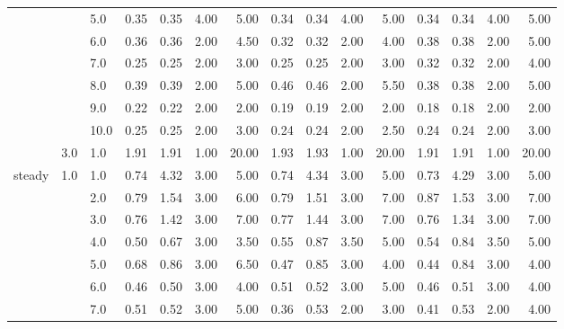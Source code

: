 \begin{tabular}{lllrrrrrrrrrrrr}
       &     & 5.0  &       0.35 &      0.35 & 4.00 &   5.00 &       0.34 &      0.34 & 4.00 &   5.00 &       0.34 &      0.34 & 4.00 &   5.00 \\
       &     & 6.0  &       0.36 &      0.36 & 2.00 &   4.50 &       0.32 &      0.32 & 2.00 &   4.00 &       0.38 &      0.38 & 2.00 &   5.00 \\
       &     & 7.0  &       0.25 &      0.25 & 2.00 &   3.00 &       0.25 &      0.25 & 2.00 &   3.00 &       0.32 &      0.32 & 2.00 &   4.00 \\
       &     & 8.0  &       0.39 &      0.39 & 2.00 &   5.00 &       0.46 &      0.46 & 2.00 &   5.50 &       0.38 &      0.38 & 2.00 &   5.00 \\
       &     & 9.0  &       0.22 &      0.22 & 2.00 &   2.00 &       0.19 &      0.19 & 2.00 &   2.00 &       0.18 &      0.18 & 2.00 &   2.00 \\
       &     & 10.0 &       0.25 &      0.25 & 2.00 &   3.00 &       0.24 &      0.24 & 2.00 &   2.50 &       0.24 &      0.24 & 2.00 &   3.00 \\
       & 3.0 & 1.0  &       1.91 &      1.91 & 1.00 &  20.00 &       1.93 &      1.93 & 1.00 &  20.00 &       1.91 &      1.91 & 1.00 &  20.00 \\
steady & 1.0 & 1.0  &       0.74 &      4.32 & 3.00 &   5.00 &       0.74 &      4.34 & 3.00 &   5.00 &       0.73 &      4.29 & 3.00 &   5.00 \\
       &     & 2.0  &       0.79 &      1.54 & 3.00 &   6.00 &       0.79 &      1.51 & 3.00 &   7.00 &       0.87 &      1.53 & 3.00 &   7.00 \\
       &     & 3.0  &       0.76 &      1.42 & 3.00 &   7.00 &       0.77 &      1.44 & 3.00 &   7.00 &       0.76 &      1.34 & 3.00 &   7.00 \\
       &     & 4.0  &       0.50 &      0.67 & 3.00 &   3.50 &       0.55 &      0.87 & 3.50 &   5.00 &       0.54 &      0.84 & 3.50 &   5.00 \\
       &     & 5.0  &       0.68 &      0.86 & 3.00 &   6.50 &       0.47 &      0.85 & 3.00 &   4.00 &       0.44 &      0.84 & 3.00 &   4.00 \\
       &     & 6.0  &       0.46 &      0.50 & 3.00 &   4.00 &       0.51 &      0.52 & 3.00 &   5.00 &       0.46 &      0.51 & 3.00 &   4.00 \\
       &     & 7.0  &       0.51 &      0.52 & 3.00 &   5.00 &       0.36 &      0.53 & 2.00 &   3.00 &       0.41 &      0.53 & 2.00 &   4.00 \\

\end{tabular}
